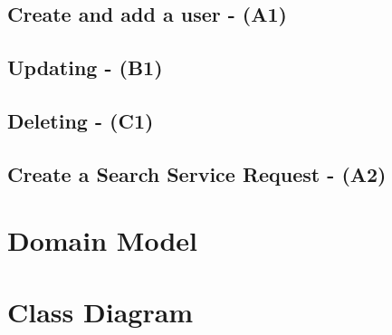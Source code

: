 \documentclass{article}
\begin{document}
\subsection{Create and add a user - (A1)}


\subsection{Updating - (B1)}


\subsection{Deleting - (C1)}


\subsection{Create a Search Service Request - (A2)}



\section{Domain Model}

\section{Class Diagram}
\end{document}
